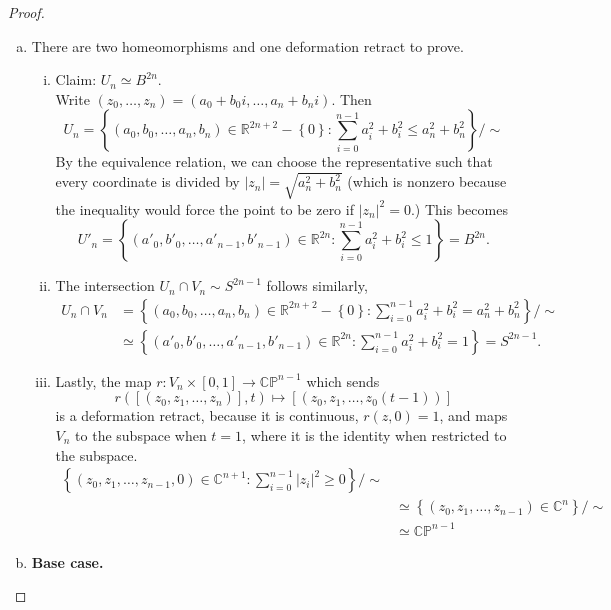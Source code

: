 \documentclass{article}
\newcommand{\fn}[3]{#1 \colon #2 \rightarrow #3}
\newcommand{\set}[1]{\left\{ #1 \right\}}
\begin{document}
\begin{proof} \text{} \\
  \begin{enumerate}[(a)]
    \item There are two homeomorphisms and one deformation retract to prove.
      \begin{enumerate}[(i)]
      \item Claim: $U_n \simeq B^{2n}$. \\
      Write $(z_0, \hdots, z_n) = (a_0 + b_0i, \hdots, a_n + b_ni)$. Then
      \[
        U_n = \set{(a_0, b_0, \hdots, a_n, b_n) \in \mathbb R^{2n+2}- \set 0:
        \sum_{i=0}^{n-1} a_i^2 + b_i^2 \leq a_n^2 + b_n^2}/\sim
      \] By the equivalence relation, we can choose the representative such
      that every coordinate is divided by $|z_n| = \sqrt{a_n^2 + b_n^2}$ (which
      is nonzero because the inequality would force the point to be zero if $|z_n|^2 = 0$.) This becomes \[
        U'_n = \set{(a'_0, b'_0, \hdots, a'_{n-1}, b'_{n-1}) \in \mathbb R^{2n}:
      \sum_{i=0}^{n-1} a_i^2 + b_i^2 \leq 1} = B^{2n}.
      \]
      \item The intersection $U_n \cap V_n \sim S^{2n-1}$ follows similarly,
      \begin{align*}
        U_n \cap V_n
        &= \set{(a_0, b_0, \hdots, a_n, b_n) \in \mathbb R^{2n+2}- \set 0:
        \sum_{i=0}^{n-1} a_i^2 + b_i^2 = a_n^2 + b_n^2}/\sim \\
        &\simeq \set{(a'_0, b'_0, \hdots, a'_{n-1}, b'_{n-1}) \in \mathbb R^{2n}:
      \sum_{i=0}^{n-1} a_i^2 + b_i^2 = 1} = S^{2n-1}.
      \end{align*}
      \item Lastly, the map $\fn{r}{V_n \times [0, 1]}{\mathbb{CP}^{n-1}}$ which
      sends \[
        r([(z_0, z_1, \hdots, z_n)], t) \mapsto [(z_0, z_1, \hdots, z_0(t-1))]
      \] is a deformation retract, because it is continuous, $r(z, 0) = 1$, and
      maps $V_n$ to the subspace when $t = 1$, where it is the identity when
      restricted to the subspace. \begin{align*}
        \set{(z_0, z_1, \hdots, z_{n-1}, 0) \in \mathbb C^{n+1}:
        \sum_{i=0}^{n-1} |z_i|^2 \geq 0}/\sim \\
        &\simeq \set{(z_0, z_1, \hdots, z_{n-1}) \in \mathbb C^{n}}/\sim \\
        &\simeq \mathbb{CP}^{n-1}
      \end{align*}
    \end{enumerate}
    \item \textbf{Base case.}

\end{enumerate}
\end{proof}
\end{document}
